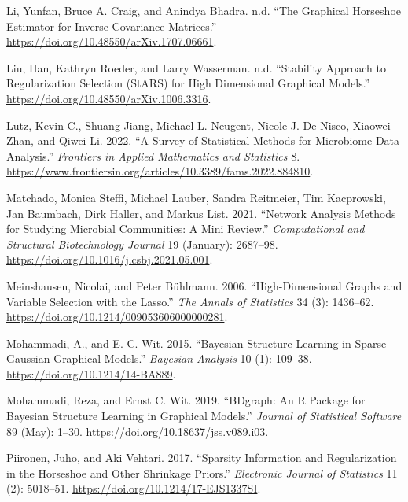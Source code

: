 \documentclass[
]{article}
\newlength{\cslhangindent}
\newlength{\cslentryspacingunit} %
\newenvironment{CSLReferences}[2] %
 {%
  \setlength{\parindent}{0pt}
  \ifodd #1
  \let\oldpar\par
  \def\par{\hangindent=\cslhangindent\oldpar}
  \fi
  \setlength{\parskip}{#2\cslentryspacingunit}
 }%
 {}
\begin{document}
\begin{CSLReferences}{1}{0}
\leavevmode{}%
Li, Yunfan, Bruce A. Craig, and Anindya Bhadra. n.d. {``The Graphical
Horseshoe Estimator for Inverse Covariance Matrices.''}
\url{https://doi.org/10.48550/arXiv.1707.06661}.

\leavevmode{}%
Liu, Han, Kathryn Roeder, and Larry Wasserman. n.d. {``Stability
Approach to Regularization Selection (StARS) for High Dimensional
Graphical Models.''} \url{https://doi.org/10.48550/arXiv.1006.3316}.

\leavevmode{}%
Lutz, Kevin C., Shuang Jiang, Michael L. Neugent, Nicole J. De Nisco,
Xiaowei Zhan, and Qiwei Li. 2022. {``A Survey of Statistical Methods for
Microbiome Data Analysis.''} \emph{Frontiers in Applied Mathematics and
Statistics} 8.
\url{https://www.frontiersin.org/articles/10.3389/fams.2022.884810}.

\leavevmode{}%
Matchado, Monica Steffi, Michael Lauber, Sandra Reitmeier, Tim
Kacprowski, Jan Baumbach, Dirk Haller, and Markus List. 2021. {``Network
Analysis Methods for Studying Microbial Communities: A Mini Review.''}
\emph{Computational and Structural Biotechnology Journal} 19 (January):
2687--98. \url{https://doi.org/10.1016/j.csbj.2021.05.001}.

\leavevmode{}%
Meinshausen, Nicolai, and Peter Bühlmann. 2006. {``High-Dimensional
Graphs and Variable Selection with the Lasso.''} \emph{The Annals of
Statistics} 34 (3): 1436--62.
\url{https://doi.org/10.1214/009053606000000281}.

\leavevmode{}%
Mohammadi, A., and E. C. Wit. 2015. {``Bayesian Structure Learning in
Sparse Gaussian Graphical Models.''} \emph{Bayesian Analysis} 10 (1):
109--38. \url{https://doi.org/10.1214/14-BA889}.

\leavevmode{}%
Mohammadi, Reza, and Ernst C. Wit. 2019. {``BDgraph: An R Package for
Bayesian Structure Learning in Graphical Models.''} \emph{Journal of
Statistical Software} 89 (May): 1--30.
\url{https://doi.org/10.18637/jss.v089.i03}.

\leavevmode{}%
Piironen, Juho, and Aki Vehtari. 2017. {``Sparsity Information and
Regularization in the Horseshoe and Other Shrinkage Priors.''}
\emph{Electronic Journal of Statistics} 11 (2): 5018--51.
\url{https://doi.org/10.1214/17-EJS1337SI}.


\end{CSLReferences}
\end{document}
